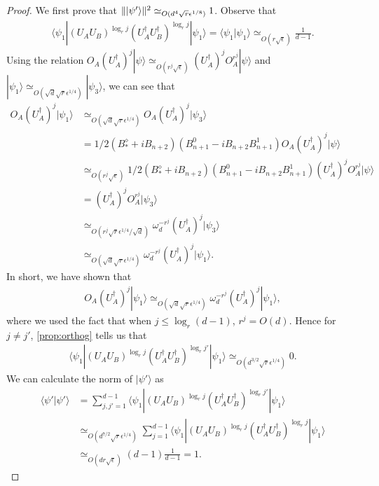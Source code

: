 \documentclass[11pt,letterpaper]{article}
\newcommand{\ket}[1]{|#1\rangle}
\newcommand{\bra}[1]{\langle#1|}
\newcommand{\braket}[2]{\langle#1|#2\rangle}
\newcommand{\ct}{^{\dagger}}
\DeclarePairedDelimiter{\norm}{\lVert}{\rVert}
\newcommand{\1}{\mathbb{1}}
\newcommand{\ep}{\epsilon}
\newcommand{\se}{\sqrt{\epsilon}}
\newcommand{\qe}{\epsilon^{1/4}}
\newcommand{\sd}{\sqrt{d}}
\newcommand{\sr}{\sqrt{r}}
\newcommand{\appd}[1]{\simeq_{#1}}
\theoremstyle{definition}
\begin{document}
\begin{proof}
	We first prove that $\norm{\ket{\psi'}}^2 \appd{O(d^4 \sr \ep^{1/8})} 1$.
	Observe that 
	\begin{align}
		\bra{\psi_1} (U_AU_B)^{\log_r j} (U_A\ct U_B\ct)^{\log_r j}  \ket{\psi_1} =
		\braket{\psi_1}{\psi_1} \appd{O(r\se)} \frac{1}{d-1}.
	\end{align}
	Using the relation $O_A(U_A\ct)^j \ket{\psi} \appd{O(r^j \se)} (U_A\ct)^j O_A^{r^j}\ket{\psi}$ and $\ket{\psi_1} \appd{O(\sd \sr \qe)} \ket{\psi_3}$,
        we can see that 
        \begin{align}
            	O_A (U_A\ct)^j \ket{\psi_1} &\appd{O(\sd \sr \qe)} O_A(U_A\ct)^j \ket{\psi_3} \\
            	& = 1/2 (B_\ast^\diamond + i B_{n+2})(B_{n+1}^0 - iB_{n+2}B_{n+1}^1) O_A (U_A\ct)^j \ket{\psi} \\
            	& \appd{O(r^j \se)} 1/2 (B_\ast^\diamond + i B_{n+2})(B_{n+1}^0 - iB_{n+2}B_{n+1}^1) (U_A\ct)^j O_A^{r^j} \ket{\psi} \\
            	& = (U_A\ct)^j O_A^{r^j} \ket{\psi_3} \\
            	& \appd{O(r^j \sr \qe/\sd)} \omega_d^{-r^j}(U_A\ct)^j \ket{\psi_3} \\
            	& \appd{O(\sd \sr\qe)} \omega_d^{-r^j}  (U_A\ct)^j \ket{\psi_1}.
        \end{align}
        In short, we have shown that 
        \begin{align}
        		O_A (U_A\ct)^j \ket{\psi_1} \appd{O(\sd \sr \qe)}\omega_d^{-r^j}  (U_A\ct)^j \ket{\psi_1},
        \end{align}
        where we used the fact that when $j \leq \log_r(d-1)$, $r^j = O(d)$.
	Hence for $j \neq j'$, \cref{prop:orthog} tells us that  
	\begin{align}
		\bra{\psi_1} (U_AU_B)^{\log_r j} (U_A\ct U_B\ct)^{\log_r j'} \ket{\psi_1} \appd{O(d^{3/2} \sr \qe)} 0.
	\end{align}
	We can calculate the norm of $\ket{\psi'}$ as 
	\begin{align}
		\braket{\psi'}{\psi'} &=\sum_{j,j'=1}^{d-1} \bra{\psi_1} (U_AU_B)^{\log_r j} (U_A\ct U_B\ct)^{\log_r j'} \ket{\psi_1}\\
		&\appd{O(d^{7/2} \sr \qe)} \sum_{j=1}^{d-1} \bra{\psi_1} (U_AU_B)^{\log_r j} (U_A\ct U_B\ct)^{\log_r j} \ket{\psi_1}\\
		&\appd{O(dr\se)} (d-1) \frac{1}{d-1} = 1.
	\end{align}
	

\end{proof}
\end{document}
